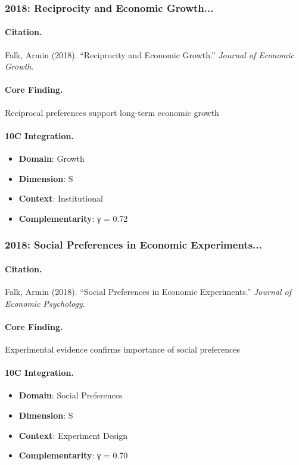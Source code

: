\subsubsection{2018: Reciprocity and Economic Growth...}

\paragraph{Citation.}
Falk, Armin (2018). ``Reciprocity and Economic Growth.''
\textit{Journal of Economic Growth}.

\paragraph{Core Finding.}
Reciprocal preferences support long-term economic growth

\paragraph{10C Integration.}
\begin{itemize}[nosep]
  \item \textbf{Domain}: Growth
  \item \textbf{Dimension}: S
  \item \textbf{Context}: Institutional
  \item \textbf{Complementarity}: γ = 0.72
\end{itemize}


\subsubsection{2018: Social Preferences in Economic Experiments...}

\paragraph{Citation.}
Falk, Armin (2018). ``Social Preferences in Economic Experiments.''
\textit{Journal of Economic Psychology}.

\paragraph{Core Finding.}
Experimental evidence confirms importance of social preferences

\paragraph{10C Integration.}
\begin{itemize}[nosep]
  \item \textbf{Domain}: Social Preferences
  \item \textbf{Dimension}: S
  \item \textbf{Context}: Experiment Design
  \item \textbf{Complementarity}: γ = 0.70
\end{itemize}


